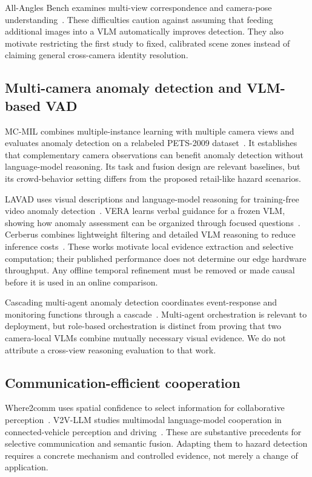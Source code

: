 \documentclass[10pt,a4paper]{article}
\begin{document}
All-Angles Bench examines multi-view correspondence and camera-pose understanding~\cite{angles}. These difficulties caution against assuming that feeding additional images into a VLM automatically improves detection. They also motivate restricting the first study to fixed, calibrated scene zones instead of claiming general cross-camera identity resolution.

\subsection{Multi-camera anomaly detection and VLM-based VAD}
MC-MIL combines multiple-instance learning with multiple camera views and evaluates anomaly detection on a relabeled PETS-2009 dataset~\cite{mcmil}. It establishes that complementary camera observations can benefit anomaly detection without language-model reasoning. Its task and fusion design are relevant baselines, but its crowd-behavior setting differs from the proposed retail-like hazard scenarios.

LAVAD uses visual descriptions and language-model reasoning for training-free video anomaly detection~\cite{lavad}. VERA learns verbal guidance for a frozen VLM, showing how anomaly assessment can be organized through focused questions~\cite{vera}. Cerberus combines lightweight filtering and detailed VLM reasoning to reduce inference costs~\cite{cerberus}. These works motivate local evidence extraction and selective computation; their published performance does not determine our edge hardware throughput. Any offline temporal refinement must be removed or made causal before it is used in an online comparison.

Cascading multi-agent anomaly detection coordinates event-response and monitoring functions through a cascade~\cite{cascade}. Multi-agent orchestration is relevant to deployment, but role-based orchestration is distinct from proving that two camera-local VLMs combine mutually necessary visual evidence. We do not attribute a cross-view reasoning evaluation to that work.

\subsection{Communication-efficient cooperation}
Where2comm uses spatial confidence to select information for collaborative perception~\cite{where}. V2V-LLM studies multimodal language-model cooperation in connected-vehicle perception and driving~\cite{v2v}. These are substantive precedents for selective communication and semantic fusion. Adapting them to hazard detection requires a concrete mechanism and controlled evidence, not merely a change of application.
\end{document}

